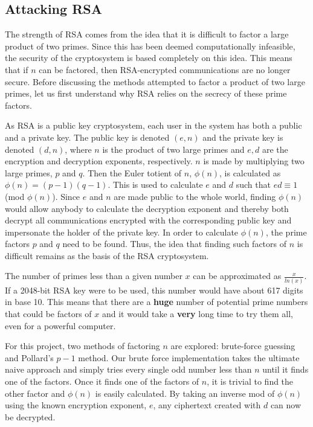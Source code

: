 \documentclass[12pt]{report}
\begin{document}
\subsection{Attacking RSA}
The strength of RSA comes from the idea that it is difficult to factor a large product of two primes. Since this has been deemed computationally infeasible, the
security of the cryptosystem is based completely on this idea. This means that if $n$ can be factored, then RSA-encrypted communications are no longer secure.
Before discussing the methods attempted to factor a product of two large primes, let us first understand why RSA relies on the secrecy of these prime factors.

As RSA is a public key cryptosystem, each user in the system has both a public and a private key. The public key is denoted $(e,n)$ and the private key is denoted
$(d,n)$, where $n$ is the product of two large primes and $e,d$ are the encryption and decryption exponents, respectively. $n$ is made by multiplying two large
primes, $p$ and $q$. Then the Euler totient of $n$, $\phi(n)$, is calculated as $\phi(n) = (p-1)(q-1)$. This is used to calculate $e$ and $d$ such that
$ed \equiv 1$ (mod $\phi(n)$). Since $e$ and $n$ are made public to the whole world, finding $\phi(n)$ would allow anybody to calculate the decryption exponent and
thereby both decrypt all communications encrypted with the corresponding public key and impersonate the holder of the private key. In order to calculate $\phi(n)$,
the prime factors $p$ and $q$ need to be found. Thus, the idea that finding such factors of $n$ is difficult remains as the basis of the RSA cryptosystem.

The number of primes less than a given number $x$ can be approximated as $\frac{x}{ln(x)}$. If a 2048-bit RSA key were to be used, this number would have about 617
digits in base 10. This means that there are a \textbf{huge} number of potential prime numbers that could be factors of $x$ and it would take a \textbf{very} long
time to try them all, even for a powerful computer.

For this project, two methods of factoring $n$ are explored: brute-force guessing and Pollard's $p-1$ method.\cite{pollard} Our brute force implementation takes the
ultimate naive approach and simply tries every single odd number less than $n$ until it finds one of the factors. Once it finds one of the factors of $n$, it is
trivial to find the other factor and $\phi(n)$ is easily calculated. By taking an inverse mod of $\phi(n)$ using the known encryption exponent, $e$, any ciphertext
created with $d$ can now be decrypted.
\end{document}
